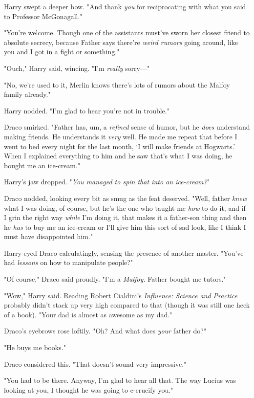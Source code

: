 Harry swept a deeper bow. "And thank \emph{you} for reciprocating with what you 
said to Professor McGonagall."

"You're welcome. Though one of the assistants must've sworn her closest friend 
to absolute secrecy, because Father says there're \emph{weird rumors} going 
around, like you and I got in a fight or something."

"Ouch," Harry said, wincing. "I'm \emph{really} sorry---"

"No, we're used to it, Merlin knows there's lots of rumors about the Malfoy 
family already."

Harry nodded. "I'm glad to hear you're not in trouble."

Draco smirked. "Father has, um, a \emph{refined} sense of humor, but he 
\emph{does} understand making friends. He understands it \emph{very} well. He 
made me repeat that before I went to bed every night for the last month, `I 
will make friends at Hogwarts.' When I explained everything to him and he saw 
that's what I was doing, he bought me an ice-cream."

Harry's jaw dropped. "\emph{You managed to spin that into an ice-cream?}"

Draco nodded, looking every bit as smug as the feat deserved. "Well, father 
\emph{knew} what I was doing, of course, but he's the one who taught me 
\emph{how} to do it, and if I grin the right way \emph{while} I'm doing it, 
that makes it a father-son thing and then he \emph{has} to buy me an ice-cream 
or I'll give him this sort of sad look, like I think I must have disappointed 
him."

Harry eyed Draco calculatingly, sensing the presence of another master. "You've 
had \emph{lessons} on how to manipulate people?"

"Of course," Draco said proudly. "I'm a \emph{Malfoy.} Father bought me tutors."

"Wow," Harry said. Reading Robert Cialdini's \emph{Influence: Science and 
Practice} probably didn't stack up very high compared to that (though it was 
still one heck of a book). "Your dad is almost as awesome as my dad."

Draco's eyebrows rose loftily. "Oh? And what does \emph{your} father do?"

"He buys me books."

Draco considered this. "That doesn't sound very impressive."

"You had to be there. Anyway, I'm glad to hear all that. The way Lucius was 
looking at you, I thought he was going to c-crucify you."

